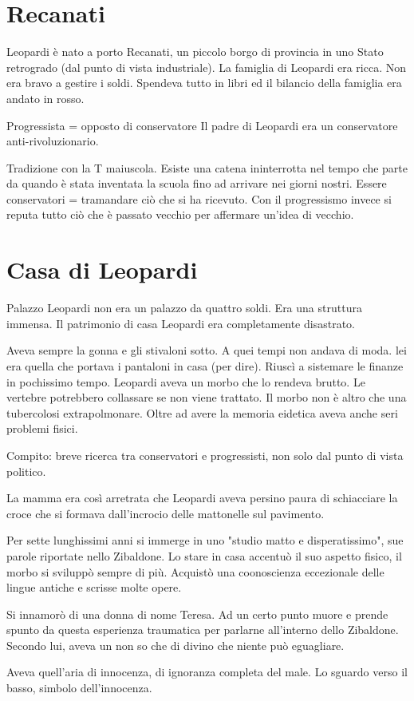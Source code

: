 \documentclass{article}
\begin{document}
    \section{Recanati}
    Leopardi è nato a porto Recanati, un piccolo borgo di provincia in uno Stato retrogrado (dal punto di vista industriale). La famiglia di Leopardi era ricca. Non era bravo a gestire i soldi. Spendeva tutto in libri ed il bilancio della famiglia era andato in rosso.

    Progressista = opposto di conservatore
    Il padre di Leopardi era un conservatore anti-rivoluzionario.

    Tradizione con la T maiuscola. Esiste una catena ininterrotta nel tempo che parte da quando è stata inventata la scuola fino ad arrivare nei giorni nostri. Essere conservatori = tramandare ciò che si ha ricevuto.
    Con il progressismo invece si reputa tutto ciò che è passato vecchio per affermare un'idea di vecchio.

    \section{Casa di Leopardi}
    Palazzo Leopardi non era un palazzo da quattro soldi. Era una struttura immensa.
    Il patrimonio di casa Leopardi era completamente disastrato.

    Aveva sempre la gonna e gli stivaloni sotto. A quei tempi non andava di moda.
    lei era quella che portava i pantaloni in casa (per dire). Riuscì a sistemare le finanze in pochissimo tempo.
    Leopardi aveva un morbo che lo rendeva brutto. Le vertebre potrebbero collassare se non viene trattato. Il morbo non è altro che una tubercolosi extrapolmonare. Oltre ad avere la memoria eidetica aveva anche seri problemi fisici.

    Compito: breve ricerca tra conservatori e progressisti, non solo dal punto di vista politico.
    
    La mamma era così arretrata che Leopardi aveva persino paura di schiacciare la croce che si formava dall'incrocio delle mattonelle sul pavimento.

    Per sette lunghissimi anni si immerge in uno "studio matto e disperatissimo", sue parole riportate nello Zibaldone. Lo stare in casa accentuò il suo aspetto fisico, il morbo si sviluppò sempre di più. Acquistò una coonoscienza eccezionale delle lingue antiche e scrisse molte opere.

    Si innamorò di una donna di nome Teresa. Ad un certo punto muore e prende spunto da questa esperienza traumatica per parlarne all'interno dello Zibaldone. Secondo lui, aveva un non so che di divino che niente può eguagliare.

    Aveva quell'aria di innocenza, di ignoranza completa del male.
    Lo sguardo verso il basso, simbolo dell'innocenza.
\end{document}
